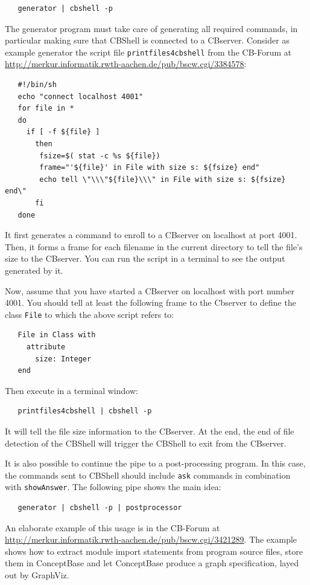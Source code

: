 \begin{verbatim}
   generator | cbshell -p
\end{verbatim}

The generator program must take care of generating all required commands, in particular
making sure that CBShell is connected to a CBserver. Consider as example generator the 
script file {\tt print\-files\-4cbshell}  from the
CB-Forum at
\url{http://merkur.informatik.rwth-aachen.de/pub/bscw.cgi/3384578}:

\begin{verbatim}
   #!/bin/sh
   echo "connect localhost 4001" 
   for file in *
   do
     if [ -f ${file} ] 
       then
        fsize=$( stat -c %s ${file})
        frame="'${file}' in File with size s: ${fsize} end"
        echo tell \"\\\"${file}\\\" in File with size s: ${fsize} end\"
       fi
   done
\end{verbatim}

It first generates a command to enroll to a CBserver on localhost at port 4001.
Then, it forms a frame for each filename in the current directory to tell the
file's size to the CBserver. 
You can run the script in a terminal to see the output generated by it. 

Now, assume that you have started a CBserver on localhost with port number 4001.
You should tell at least the following frame to the Cbserver to define
the class {\tt File} to which the above script refers to:

\begin{verbatim}
   File in Class with
     attribute
       size: Integer
   end
\end{verbatim}


Then execute in a terminal window:

\begin{verbatim}
   printfiles4cbshell | cbshell -p
\end{verbatim}

It will tell the file size information to the CBserver. At the end, the end of file
detection of the CBShell will trigger the CBShell to exit from the CBserver.

It is also possible to continue the pipe to a post-processing program. In this case,
the commands sent to CBShell should include {\tt ask} commands in combination
with {\tt showAnswer}. The following pipe shows the main idea:

\begin{verbatim}
   generator | cbshell -p | postprocessor
\end{verbatim}

An elaborate example of this usage is in the CB-Forum at
\url{http://merkur.informatik.rwth-aachen.de/pub/bscw.cgi/3421289}.
The example shows how to extract module import statements from program
source files, store them in ConceptBase and let ConceptBase produce
a graph specification, layed out by GraphViz.



